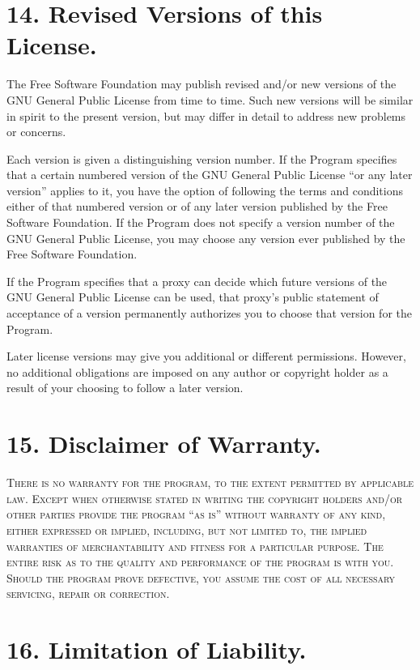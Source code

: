 \documentclass[11pt,a4paper]{article}
\begin{document}
\part*{14. Revised Versions of this License.}

The Free Software Foundation may publish revised and/or new versions of
the GNU General Public License from time to time. Such new versions will
be similar in spirit to the present version, but may differ in detail to
address new problems or concerns.

Each version is given a distinguishing version number. If the Program
specifies that a certain numbered version of the GNU General Public
License “or any later version” applies to it, you have the option of
following the terms and conditions either of that numbered version or of
any later version published by the Free Software Foundation. If the
Program does not specify a version number of the GNU General Public
License, you may choose any version ever published by the Free Software
Foundation.

If the Program specifies that a proxy can decide which future versions
of the GNU General Public License can be used, that proxy's public
statement of acceptance of a version permanently authorizes you to
choose that version for the Program.

Later license versions may give you additional or different permissions.
However, no additional obligations are imposed on any author or
copyright holder as a result of your choosing to follow a later version.

\part*{15. Disclaimer of Warranty.}

\textsc{There is no warranty for the program, to the extent permitted by
applicable law. Except when otherwise stated in writing the copyright
holders and/or other parties provide the program “as is” without
warranty of any kind, either expressed or implied, including, but not
limited to, the implied warranties of merchantability and fitness for a
particular purpose. The entire risk as to the quality and performance of
the program is with you. Should the program prove defective, you assume
the cost of all necessary servicing, repair or correction.}

\part*{16. Limitation of Liability.}
\end{document}
